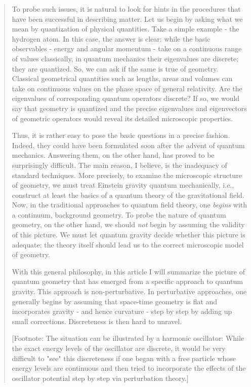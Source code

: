 \begin{quote}
To probe such issues, it is natural to look for hints in the
procedures that have been successful in describing matter.  Let us
begin by asking what we mean by quantization of physical quantities.
Take a simple example - the hydrogen atom.  In this case, the answer is
clear: while the basic observables - energy and angular momentum -
take on a continuous range of values classically, in quantum mechanics
their eigenvalues are discrete; they are quantized.  So, we can ask if
the same is true of geometry.  Classical geometrical quantities such as
lengths, areas and volumes can take on continuous values on the phase
space of general relativity.  Are the eigenvalues of corresponding
quantum operators discrete?  If so, we would say that geometry is
quantized and the precise eigenvalues and eigenvectors of geometric
operators would reveal its detailed microscopic properties.

Thus, it is rather easy to pose the basic questions in a precise
fashion.  Indeed, they could have been formulated soon after the advent
of quantum mechanics.  Answering them, on the other hand, has proved to
be surprisingly difficult.  The main reason, I believe, is the
inadequacy of standard techniques.  More precisely, to examine the
microscopic structure of geometry, we must treat Einstein gravity
quantum mechanically, i.e., construct at least the basics of a quantum
theory of the gravitational field.  Now, in the traditional approaches
to quantum field theory, one \emph{begins} with a continuum, background
geometry.  To probe the nature of quantum geometry, on the other hand,
we should \emph{not} begin by assuming the validity of this picture.  We must
let quantum gravity decide whether this picture is adequate; the theory
itself should lead us to the correct microscopic model of geometry.

With this general philosophy, in this article I will summarize the
picture of quantum geometry that has emerged from a specific approach to
quantum gravity.  This approach is non-perturbative.  In perturbative
approaches, one generally begins by assuming that space-time geometry is
flat and incorporates gravity - and hence curvature - step by step by
adding up small corrections.  Discreteness is then hard to unravel.

[Footnote: The situation can be illustrated by a harmonic oscillator:
While the exact energy levels of the oscillator are discrete, it would
be very difficult to "see" this discreteness if one began with a free
particle whose energy levels are continuous and then tried to
incorporate the effects of the oscillator potential step by step via
perturbation theory.]   


\end{quote}
